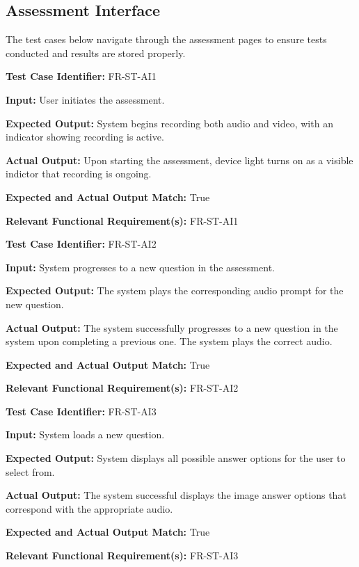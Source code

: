 \documentclass[12pt, titlepage]{article}
\begin{document}
\newpage{}

\subsection{Assessment Interface}
\hspace{2em}The test cases below navigate through the assessment pages to ensure tests conducted and results 
are stored properly. 

\begin{mdframed}[linewidth=0.5mm] \par
  \textbf{Test Case Identifier:} FR-ST-AI1 \par
  \textbf{Input:} User initiates the assessment.\par
  \textbf{Expected Output:}  System begins recording both audio and video, with an indicator showing
  recording is active. \par
  \textbf{Actual Output:} Upon starting the assessment, device light turns on as a visible indictor that recording is ongoing. \par
  \textbf{Expected and Actual Output Match:} True \par
  \textbf{Relevant Functional Requirement(s):} FR-ST-AI1
\end{mdframed}

\begin{mdframed}[linewidth=0.5mm] \par
  \textbf{Test Case Identifier:} FR-ST-AI2 \par
  \textbf{Input:} System progresses to a new question in the assessment.
  \par
  \textbf{Expected Output:} The system plays the corresponding audio prompt for the new question. 
  \par
  \textbf{Actual Output:} The system successfully progresses to a new question in the system upon completing a previous one.
  The system plays the correct audio.\par 
  \textbf{Expected and Actual Output Match:} True \par
  \textbf{Relevant Functional Requirement(s):} FR-ST-AI2 
\end{mdframed}

\begin{mdframed}[linewidth=0.5mm] \par
  \textbf{Test Case Identifier:} FR-ST-AI3 \par
  \textbf{Input:} System loads a new question.
  \par
  \textbf{Expected Output:} System displays all possible answer options for the user to select from.
  \par
  \textbf{Actual Output:} The system successful displays the image answer options that correspond with the appropriate audio. \par 
  \textbf{Expected and Actual Output Match:} True \par
  \textbf{Relevant Functional Requirement(s):} FR-ST-AI3
\end{mdframed}
\end{document}

